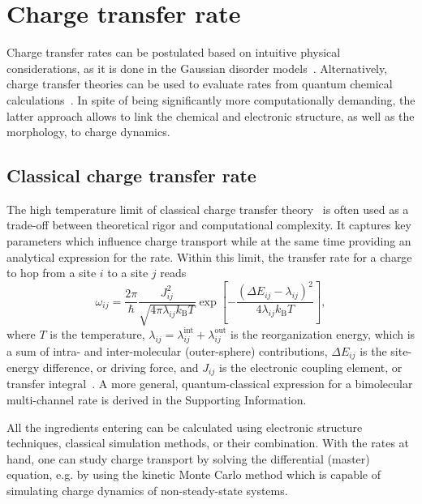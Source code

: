 \section{Charge transfer rate}
\label{sec:rates}

Charge transfer rates can be postulated based on intuitive physical considerations, as it is done in the Gaussian disorder models~\cite{walker_electrical_2002,baessler_charge_1993,borsenberger_charge_1991,pasveer_unified_2005}. Alternatively, charge transfer theories can be used to evaluate rates from quantum chemical calculations~\cite{bredas_molecular_2009,coropceanu_charge_2007,bredas_charge-transfer_2004,nelson_modeling_2009,baumeier_density-functional_2010,kirkpatrick_approximate_2008}. In spite of being significantly more computationally demanding, the latter approach allows to link the chemical and electronic structure, as well as the morphology, to charge dynamics.

\subsection{Classical charge transfer rate}
The high temperature limit of classical charge transfer  theory~\cite{marcus_electron_1993,hutchison_hopping_2005} is often used as a trade-off between theoretical rigor and computational complexity. It captures key parameters which influence charge transport while at the same time providing an analytical expression for the rate. Within this limit, the transfer rate for a charge to hop from a site $i$ to a site $j$ reads
%
\begin{equation}
\omega_{ij}  = \frac{2 \pi}{\hbar}  \frac{ J_{ij}^2 }{\sqrt{ 4 \pi \lambda_{ij} k_\text{B}T}} \exp \left[
-\frac{\left(\Delta E_{ij}-\lambda_{ij}\right)^2}{4 \lambda_{ij}
k_\text{B} T} \right],
\label{equ:marcus}
\end{equation}
%
where $T$ is the temperature, $\lambda_{ij} = \lambda_{ij}^\text{int} + \lambda_{ij}^\text{out}$ is the reorganization energy, which is a sum of intra- and inter-molecular (outer-sphere) contributions, $\Delta E_{ij}$ is the site-energy difference, or driving force, and $J_{ij}$ is the electronic coupling element, or transfer integral~\cite{note_marcus}. A more general, quantum-classical expression for a bimolecular multi-channel rate is derived in the Supporting Information.

All the ingredients entering  can be calculated using electronic structure techniques, classical simulation methods, or their combination. With the rates at hand, one can study charge transport by solving the differential (master) equation, e.g. by using the kinetic Monte Carlo method which is capable of simulating charge dynamics of non-steady-state systems.

